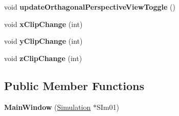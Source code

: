 \begin{DoxyCompactItemize}
\item 
\hypertarget{classMainWindow_af2c325c24155eb2198ef705d78d452d8}{}void {\bfseries update\+Orthagonal\+Perspective\+View\+Toggle} ()\label{classMainWindow_af2c325c24155eb2198ef705d78d452d8}

\item 
\hypertarget{classMainWindow_ab677ef1bf70bc78faa5680576c14cd22}{}void {\bfseries x\+Clip\+Change} (int)\label{classMainWindow_ab677ef1bf70bc78faa5680576c14cd22}

\item 
\hypertarget{classMainWindow_a019023e11d09610ad8632baeb6854c61}{}void {\bfseries y\+Clip\+Change} (int)\label{classMainWindow_a019023e11d09610ad8632baeb6854c61}

\item 
\hypertarget{classMainWindow_af30a90f508a3d0b4434ddcaf848c69ac}{}void {\bfseries z\+Clip\+Change} (int)\label{classMainWindow_af30a90f508a3d0b4434ddcaf848c69ac}

\end{DoxyCompactItemize}
\subsection*{Public Member Functions}
\begin{DoxyCompactItemize}
\item 
\hypertarget{classMainWindow_aa1c3a3a33e1e67e055b8448ad9a9e208}{}{\bfseries Main\+Window} (\hyperlink{classSimulation}{Simulation} $\ast$S\+Im01)\label{classMainWindow_aa1c3a3a33e1e67e055b8448ad9a9e208}

\end{DoxyCompactItemize}
